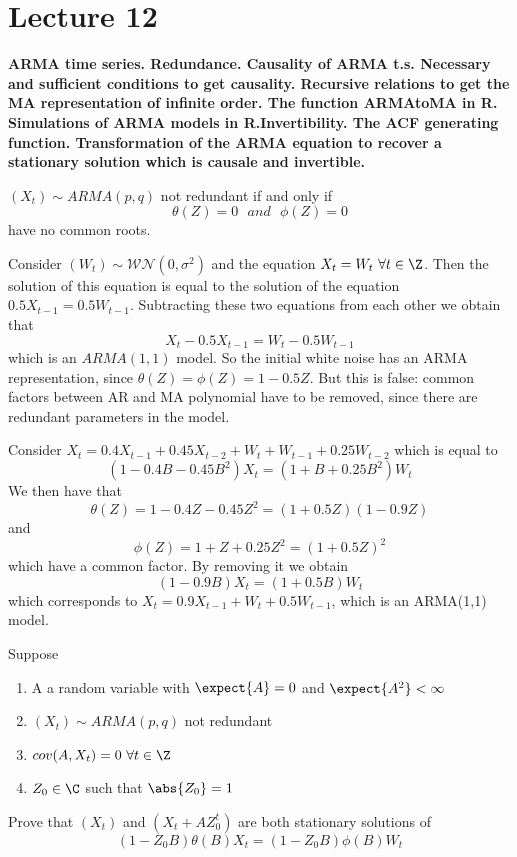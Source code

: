 \section{Lecture 12}
\label{lecture12}

\begin{center}
    \textbf{ARMA time series. Redundance. Causality of ARMA t.s. Necessary and sufficient conditions to get causality. Recursive relations to get the MA representation of infinite order. The function ARMAtoMA in R. Simulations of ARMA models in R.Invertibility. The ACF generating function. Transformation of the ARMA equation to recover a stationary solution which is causale and invertible.}
\end{center}

\begin{definition}
    $(X_t)\sim ARMA(p,q)$ not redundant if and only if
    \[
        \theta(Z)=0\ \ \ and\ \ \ \phi(Z)=0  
    \]
    have no common roots.
\end{definition}

\begin{example}
    Consider $(W_t)\sim\mathcal{WN}(0,\sigma^2)$ and the equation $X_t=W_t\ \forall t\in\Z$. Then the solution of this equation is equal to the solution of the equation $0.5X_{t-1}=0.5W_{t-1}$. Subtracting these two equations from each other we obtain that
    \[
        X_t-0.5X_{t-1}=W_t-0.5W_{t-1}  
    \] 
    which is an $ARMA(1,1)$ model. So the initial white noise has an ARMA representation, since $\theta(Z)=\phi(Z)=1-0.5Z$. But this is false: common factors between AR and MA polynomial have to be removed, since there are redundant parameters in the model.
\end{example}

\begin{example}
    Consider $X_t=0.4X_{t-1}+0.45X_{t-2}+W_t+W_{t-1}+0.25W_{t-2}$ which is equal to
    \[
        (1-0.4B-0.45B^2)X_t=(1+B+0.25B^2)W_t
    \]
    We then have that
    \[
        \theta(Z)=1-0.4Z-0.45Z^2=(1+0.5Z)(1-0.9Z)  
    \]
    and 
    \[
        \phi(Z)=1+Z+0.25Z^2=(1+0.5Z)^2 
    \]
    which have a common factor. By removing it we obtain
    \[
        (1-0.9B)X_t=(1+0.5B)W_t
    \]
    which corresponds to $X_t=0.9X_{t-1}+W_t+0.5W_{t-1}$, which is an ARMA(1,1) model.
\end{example}

\begin{exercise}
    Suppose
    \begin{enumerate}
        \item A a random variable with $\expect{A}=0$ and $\expect{A^2}<\infty$
        \item $(X_t)\sim ARMA(p,q)$ not redundant
        \item $cov(A,X_t)=0\ \forall t\in\Z$
        \item $Z_0\in\C$ such that $\abs{Z_0}=1$
    \end{enumerate}
    Prove that $(X_t)$ and $(X_t+AZ_0^t)$ are both stationary solutions of
    \[
        (1-Z_0B)\theta(B)X_t=(1-Z_0B)\phi(B)W_t
    \]
\end{exercise}

